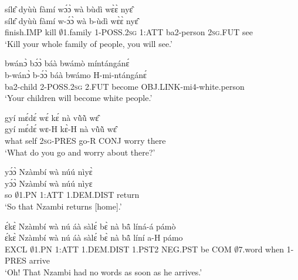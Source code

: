 \begin{exe} 
\exN\label{145}
  \glll sílɛ̂ dyùù fàmí wɔ́ɔ̀ wà bùdì wɛ̀ɛ̀ nyɛ̂ \\
       sílɛ̂ dyùù fàmí w-ɔ́ɔ̀ wà b-ùdì wɛ̀ɛ̀ nyɛ̂ \\
       finish.IMP kill $\emptyset$1.family 1-POSS.2\textsc{sg} 1:ATT ba2-person 2\textsc{sg}.FUT see  \\
    \trans `Kill your whole family of people, you will see.'
\end{exe}

\begin{exe} 
\exN\label{146}
  \glll bwánɔ̀ bɔ́ɔ̀ báà bwámò míntángánɛ́  \\
        b-wánɔ̀ b-ɔ́ɔ̀ báà bwámo H-mi-ntángánɛ́  \\
        ba2-child 2-POSS.2\textsc{sg} 2.FUT become OBJ.LINK-mi4-white.person \\
    \trans `Your children will become white people.'
\end{exe}

\begin{exe} 
\exN\label{147}
  \glll gyí mɛ́dɛ́ wɛ́ kɛ́ nà vũ̀ũ̀ wɛ̂ \\
        gyí mɛ́dɛ́ wɛ-H kɛ̀-H nà vũ̀ũ̀ wɛ̂ \\
        what self 2\textsc{sg}-PRES go-R CONJ worry there \\
    \trans `What do you go and worry about there?'
\end{exe}

\begin{exe} 
\exN\label{148}
  \glll yɔ́ɔ̀ Nzàmbí wà núú nìyɛ̀ \\
        yɔ́ɔ̀ Nzàmbí wà núú nìyɛ \\
         so $\emptyset$1.PN 1:ATT 1.DEM.DIST return\\
    \trans `So that Nzambi returns [home].'
\end{exe}

\begin{exe} 
\exN\label{149}
  \glll ɛ́kɛ̀ Nzàmbí wà nú áà sàlɛ́ bɛ̀ nà bã̂ líná-á pámò \\
      ɛ́kɛ̀ Nzàmbí wà nú áà sàlɛ́ bɛ̀ nà bã̂ líní a-H pámo \\
        EXCL $\emptyset$1.PN 1:ATT 1.DEM.DIST 1.PST2 NEG.PST be COM $\emptyset$7.word when 1-PRES arrive  \\
    \trans `Oh! That Nzambi had no words as soon as he arrives.'
\end{exe}

